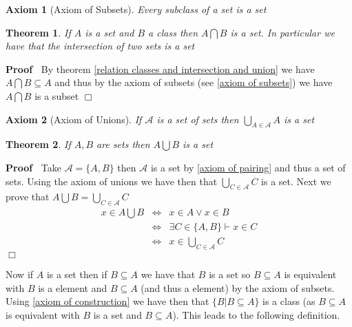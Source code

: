 \documentclass{book}
\newcommand{\nobracket}{}
\newenvironment{proof}{\noindent\textbf{Proof\ }}{\hspace*{\fill}$\Box$\medskip}
\newtheorem{axiom}{Axiom}
\newtheorem{theorem}{Theorem}
\begin{document}
{{\begin{axiom}[Axiom of Subsets]
  \label{axiom of subsets}{}Every subclass of a set is
  a set
\end{axiom}

\begin{theorem}
  If $A$ is a set and $B$ a class then $A \bigcap B$ is a set. In particular
  we have that the intersection of two sets is a set
\end{theorem}

\begin{proof}
  By theorem \ref{relation classes and intersection and union} we have $A
  \bigcap B \subseteq A$ and thus by the axiom of subsets (see \ref{axiom of
  subsets}) we have $A \bigcap B$ is a subset
\end{proof}

\begin{axiom}[Axiom of Unions]
  \label{axiom of unions}{}If $\mathcal{A}$ is a set of
  sets then $\bigcup_{A \in \mathcal{A}} A$ is a set
\end{axiom}

\begin{theorem}
  \label{union of two sets is a set}If $A, B$ are sets then $A \bigcup B$ is a
  set
\end{theorem}

\begin{proof}
  Take $\mathcal{A}= \{ A, B \}$ then $\mathcal{A}$ is a set by \ref{axiom of
  pairing} and thus a set of sets. Using the axiom of unions we have then that
  $\bigcup_{C \in \mathcal{A}} C$ is a set. Next we prove that $A \bigcup B =
  \bigcup_{C \in \mathcal{A}} C$
  \begin{eqnarray*}
    x \in A \bigcup B & \Leftrightarrow & x \in A \vee x \in B\\
    & \Leftrightarrow & \exists C \in \{ A, B \} \vdash x \in C\\
    & \Leftrightarrow & x \in \bigcup_{C \in \mathcal{A}} C
  \end{eqnarray*}
\end{proof}

Now if $A$ is a set then if $B \subseteq A$ we have that $B$ is a set so $B
\subseteq A$ is equivalent with $B$ is a element and $B \subseteq A$ (and thus
a element) by the axiom of subsets. Using \ref{axiom of construction} we have
then that $\{ B | B \subseteq A \nobracket \}$ is a class (as $B \subseteq A$
is equivalent with $B$ is a set and $B \subseteq A$). This leads to the
following definition.

}}
\end{document}
